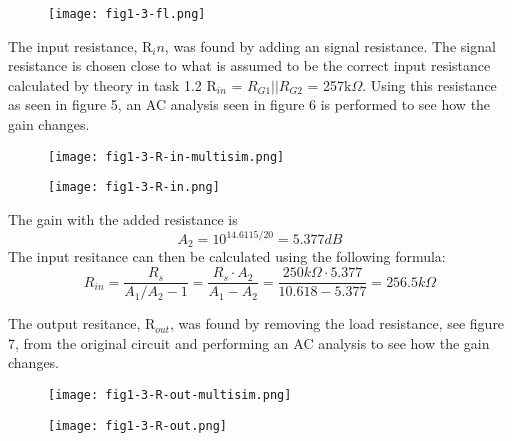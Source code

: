   \begin{figure}[h!]
        \centering
        \texttt{[image: fig1-3-fl.png]}
  \end{figure}

  \pagebreak

  The input resistance, R$_in$, was found by adding an signal resistance. The signal resistance is chosen close to what is assumed to be the correct input resistance calculated by theory in task 1.2 R$_{in}$ = $R_{G1}||R_{G2}$ = 257k$\Omega$. Using this resistance as seen in figure 5, an AC analysis seen in figure 6 is performed to see how the gain changes.\\
  
  \begin{figure}[h!]
        \centering
        \texttt{[image: fig1-3-R-in-multisim.png]}
  \end{figure}

  \begin{figure}[h!]
        \centering
        \texttt{[image: fig1-3-R-in.png]}
  \end{figure}

The gain with the added resistance is $$A_2 = 10^{14.6115/20} = 5.377 dB$$
The input resitance can then be calculated using the following formula:
$$R_{in} = \frac{R_s}{A_1 / A_2 - 1} = \frac{R_s \cdot A_2}{A_1 - A_2} = \frac{250k\Omega \cdot 5.377}{10.618 - 5.377} = 256.5 k\Omega$$

\pagebreak

The output resitance, R$_{out}$, was found by removing the load resistance, see figure 7, from the original circuit and performing an AC analysis to see how the gain changes.\\

\begin{figure}[h!]
        \centering
        \texttt{[image: fig1-3-R-out-multisim.png]}
  \end{figure}

  \begin{figure}[h!]
        \centering
        \texttt{[image: fig1-3-R-out.png]}
  \end{figure}

